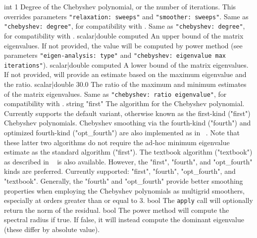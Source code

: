     {int}
    {1}
    {Degree of the Chebyshev polynomial, or the number of iterations. This
     overrides parameters {\tt "relaxation: sweeps"} and {\tt "smoother: sweeps"}.}
    {Same as {\tt "chebyshev: degree"}, for compatibility with \ifpack{}.}
    {Same as {\tt "chebyshev: degree"}, for compatibility with \ml{}.}
    {scalar|double}
    {computed}
    {An upper bound of the matrix eigenvalues. If not provided, the value will
     be computed by power method (see parameters {\tt "eigen-analysis: type"} and
     {\tt "chebyshev: eigenvalue max iterations"}).}
    {scalar|double}
    {computed}
    {A lower bound of the matrix eigenvalues.  If not provided, \ifpacktwo{}
     will provide an estimate based on the maximum eigenvalue and the ratio.}
    {scalar|double}
    {30.0}
    {The ratio of the maximum and minimum estimates of the matrix
     eigenvalues.}
    {Same as {\tt "chebyshev: ratio eigenvalue"}, for compatibility with \ml{}.}
    {string}
    {"first"}
    {The algorithm for the Chebyshev polynomial. Currently supports
     the default \ifpack{} variant, otherwise known as the first-kind ("first") Chebyshev polynomials.
     Chebyshev smoothing via the fourth-kind ("fourth") and optimized fourth-kind ("opt_fourth")
     are also implemented as in ~\cite{Lottes2022}.
     Note that these latter two algorithms do not require the ad-hoc minimum eigenvalue estimate
     as the standard \ifpack{} algorithm ("first").
     The textbook algorithm ("textbook") as described in ~\cite{Saad2003} is also available.
     However, the "first", "fourth", and "opt_fourth" kinds are preferred.
     Currently supported: "first", "fourth", "opt_fourth", and "textbook".
     Generally, the "fourth" and "opt_fourth" provide better smoothing properties
     when employing the Chebyshev polynomials as multigrid smoothers, especially at orders
     greater than or equal to 3.
    }
    {bool}
    {\false}
    {The \texttt{apply} call will optionally return the norm of the residual.}
    {bool}
    {\true}
    {The power method will compute the spectral radius if true. If false, it will
     instead compute the dominant eigenvalue (these differ by absolute value).}
